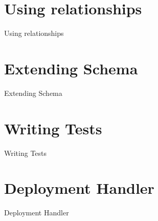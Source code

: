 \section{Using relationships}
\begin{frame}{Using relationships}
\end{frame}

\section{Extending Schema}
\begin{frame}{Extending Schema}
\end{frame}

\section{Writing Tests}
\begin{frame}{Writing Tests}
\end{frame}

\section{Deployment Handler}
\begin{frame}{Deployment Handler}
\end{frame}



